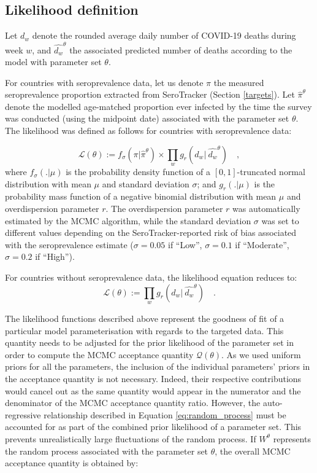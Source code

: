 

\subsection{Likelihood definition}
\label{likelihood}
Let $d_w$ denote the rounded average daily number of COVID-19 deaths during week $w$, and $\hat{d_w}^\theta$ 
the associated predicted number of deaths according to the model with parameter set $\theta$. 

For countries with seroprevalence data, let us denote $\pi$ the measured seroprevalence proportion extracted from SeroTracker (Section \ref{targets}). 
Let $\hat{\pi}^\theta$ denote the modelled age-matched proportion ever infected by the time the survey was conducted (using the midpoint date) 
associated with the parameter set $\theta$. 
The likelihood was defined as follows for countries with seroprevalence data:

\begin{equation}
    \label{eq:likelihood}
    \mathcal{L}(\theta) := f_{\sigma}(\pi | \hat{\pi}^\theta) \times \prod_w g_r(d_w | \:\hat{d_w}^\theta) \quad ,
\end{equation}
where $f_{\sigma}( . | \mu )$ is the probability density function of a $[0, 1]$-truncated normal distribution with mean $\mu$ and standard deviation $\sigma$; and 
$g_r(. | \mu)$ is the probability mass function of a negative binomial distribution with mean $\mu$ and 
overdispersion parameter $r$. The overdispersion parameter $r$ was automatically estimated by the MCMC algorithm, while the standard deviation $\sigma$ was set to different 
values depending on the SeroTracker-reported risk of bias associated with the seroprevalence estimate ($\sigma=0.05$ if ``Low'', $\sigma=0.1$ if ``Moderate'', $\sigma=0.2$ if ``High''). 

For countries without seroprevalence data, the likelihood equation reduces to:
\begin{equation}
    \label{eq:likelihood_nosero}
    \mathcal{L}(\theta) := \prod_w g_r(d_w | \:\hat{d_w}^\theta) \quad.
\end{equation}

The likelihood functions described above represent the goodness of fit of a particular model parameterisation with regards to the targeted data. 
This quantity needs to be adjusted for the prior likelihood of the parameter set in order to compute the MCMC acceptance quantity $\mathcal{Q}(\theta)$.
As we used uniform priors for all the parameters, the inclusion of the individual parameters' priors in the acceptance quantity is not necessary. 
Indeed, their respective contributions would cancel out as the same quantity would appear in the numerator and the denominator of the 
MCMC acceptance quantity ratio. However, the auto-regressive relationship described in Equation \ref{eq:random_process}
must be accounted for as part of the combined prior likelihood of a parameter set. This prevents unrealistically large fluctuations of the random process.
If $W^\theta$ represents the random process associated with the parameter set $\theta$, the overall MCMC acceptance quantity is obtained by:


